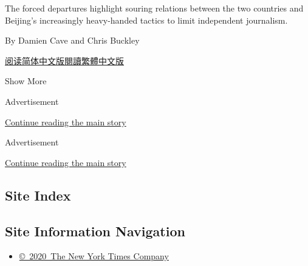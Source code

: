 \begin{enumerate}
  The forced departures highlight souring relations between the two
  countries and Beijing's increasingly heavy-handed tactics to limit
  independent journalism.

  By Damien Cave and Chris Buckley

  \href{https://cn.nytimes3xbfgragh.onion/asia-pacific/20200908/china-correspondents-bill-birtles-michael-smith/}{阅读简体中文版}\href{https://cn.nytimes3xbfgragh.onion/asia-pacific/20200908/china-correspondents-bill-birtles-michael-smith/zh-hant/}{閱讀繁體中文版}
\end{enumerate}

Show More

Advertisement

\protect\hyperlink{after-mid1}{Continue reading the main story}

Advertisement

\protect\hyperlink{after-mktg}{Continue reading the main story}

\hypertarget{site-index}{%
\subsection{Site Index}\label{site-index}}

\hypertarget{site-information-navigation}{%
\subsection{Site Information
Navigation}\label{site-information-navigation}}

\begin{itemize}
\tightlist
\item
  \href{https://help.nytimes3xbfgragh.onion/hc/en-us/articles/115014792127-Copyright-notice}{©~2020~The
  New York Times Company}
\end{itemize}

